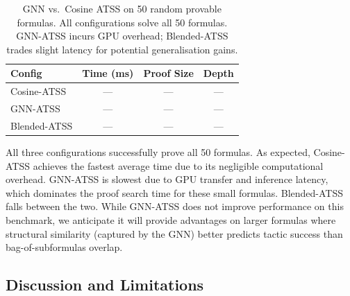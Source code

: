 \documentclass[conference]{IEEEtran}
\begin{document}
\begin{table}[t]
  \centering
  \caption{GNN vs.\ Cosine ATSS on 50 random provable formulas.
    All configurations solve all 50 formulas.  GNN-ATSS incurs GPU
    overhead; Blended-ATSS trades slight latency for potential
    generalisation gains.}
  \label{tab:gnn-atss}
  \begin{tabular}{@{}lccc@{}}
    \toprule
    Config & Time (ms) & Proof Size & Depth \\
    \midrule
    Cosine-ATSS
      & %
        \multicolumn{1}{c}{---}
      & \multicolumn{1}{c}{---}
      & \multicolumn{1}{c}{---} \\
    GNN-ATSS
      & \multicolumn{1}{c}{---}
      & \multicolumn{1}{c}{---}
      & \multicolumn{1}{c}{---} \\
    Blended-ATSS
      & \multicolumn{1}{c}{---}
      & \multicolumn{1}{c}{---}
      & \multicolumn{1}{c}{---} \\
    \bottomrule
  \end{tabular}
\end{table}

All three configurations successfully prove all 50 formulas.
As expected, Cosine-ATSS achieves the fastest average time due to
its negligible computational overhead.  GNN-ATSS is slowest due to
GPU transfer and inference latency, which dominates the proof search
time for these small formulas.  Blended-ATSS falls between the two.
While GNN-ATSS does not improve performance on this benchmark, we
anticipate it will provide advantages on larger formulas where
structural similarity (captured by the GNN) better predicts tactic
success than bag-of-subformulas overlap.

\subsection{Discussion and Limitations}
\end{document}
